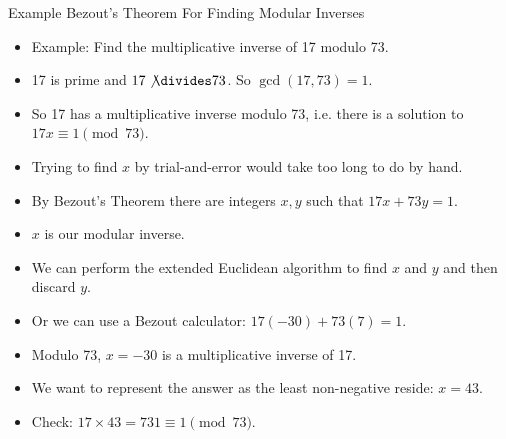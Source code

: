 \documentclass{beamer}
\begin{document}
\begin{frame}{Example Bezout's Theorem For Finding Modular Inverses}
\begin{itemize}
  \item Example: Find the multiplicative inverse of 17 modulo 73.
  \item 17 is prime and $17\not\divides 73$. So $\gcd(17,73)=1$.
  \item So 17 has a multiplicative inverse modulo 73, i.e. there is a solution to $17x\equiv 1 \pmod{73}$.
  \item Trying to find $x$ by trial-and-error would take too long to do by hand.
  \item By Bezout's Theorem there are integers $x,y$ such that $17x+73y = 1$.
  \item $x$ is our modular inverse.
  \item We can perform the extended Euclidean algorithm to find $x$ and $y$ and then discard $y$.
  \item Or we can use a Bezout calculator: $17(-30) + 73(7) = 1$.
  \item Modulo 73, $x=-30$ is a multiplicative inverse of 17.
  \item We want to represent the answer as the least non-negative reside: $x=43$.
  \item Check: $17 \times 43 = 731 \equiv 1 \pmod {73}$.
\end{itemize}
\end{frame}
\end{document}
